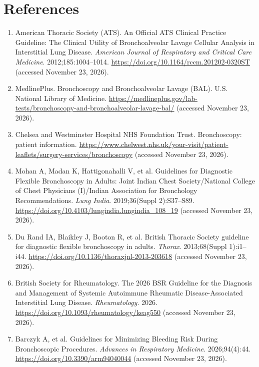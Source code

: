 \section*{References}
\begin{enumerate}
  \item American Thoracic Society (ATS). An Official ATS Clinical Practice Guideline: The Clinical Utility of Bronchoalveolar Lavage Cellular Analysis in Interstitial Lung Disease. \textit{American Journal of Respiratory and Critical Care Medicine}. 2012;185:1004--1014. \url{https://doi.org/10.1164/rccm.201202-0320ST} (accessed November 23, 2026).
  \item MedlinePlus. Bronchoscopy and Bronchoalveolar Lavage (BAL). U.S. National Library of Medicine. \url{https://medlineplus.gov/lab-tests/bronchoscopy-and-bronchoalveolar-lavage-bal/} (accessed November 23, 2026).
  \item Chelsea and Westminster Hospital NHS Foundation Trust. Bronchoscopy: patient information. \url{https://www.chelwest.nhs.uk/your-visit/patient-leaflets/surgery-services/bronchoscopy} (accessed November 23, 2026).
  \item Mohan A, Madan K, Hattigonahalli V, et al. Guidelines for Diagnostic Flexible Bronchoscopy in Adults: Joint Indian Chest Society/National College of Chest Physicians (I)/Indian Association for Bronchology Recommendations. \textit{Lung India}. 2019;36(Suppl 2):S37--S89. \url{https://doi.org/10.4103/lungindia.lungindia_108_19} (accessed November 23, 2026).
  \item Du Rand IA, Blaikley J, Booton R, et al. British Thoracic Society guideline for diagnostic flexible bronchoscopy in adults. \textit{Thorax}. 2013;68(Suppl 1):i1--i44. \url{https://doi.org/10.1136/thoraxjnl-2013-203618} (accessed November 23, 2026).
  \item British Society for Rheumatology. The 2026 BSR Guideline for the Diagnosis and Management of Systemic Autoimmune Rheumatic Disease-Associated Interstitial Lung Disease. \textit{Rheumatology}. 2026. \url{https://doi.org/10.1093/rheumatology/keag550} (accessed November 23, 2026).
  \item Barczyk A, et al. Guidelines for Minimizing Bleeding Risk During Bronchoscopic Procedures. \textit{Advances in Respiratory Medicine}. 2026;94(4):44. \url{https://doi.org/10.3390/arm94040044} (accessed November 23, 2026).
\end{enumerate}

\clearpage

